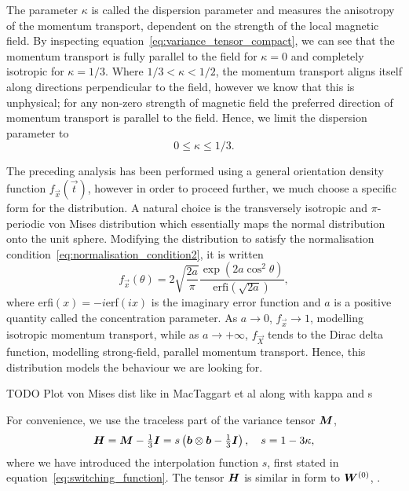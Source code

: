The parameter $\kappa$ is called the dispersion parameter and measures the anisotropy of the momentum transport, dependent on the strength of the local magnetic field. By inspecting equation~\ref{eq:variance_tensor_compact}, we can see that the momentum transport is fully parallel to the field for $\kappa = 0$ and completely isotropic for $\kappa = 1/3$. Where $1/3 < \kappa < 1/2$, the momentum transport aligns itself along directions perpendicular to the field, however we know that this is unphysical; for any non-zero strength of magnetic field the preferred direction of momentum transport is parallel to the field. Hence, we limit the dispersion parameter to
\begin{equation}
  \label{eq:dispersion_limits}
0 \leq \kappa \leq 1/3.
\end{equation}

The preceding analysis has been performed using a general orientation density function $f_\vec{x}(\vec{t})$, however in order to proceed further, we much choose a specific form for the distribution. A natural choice is the transversely isotropic and $\pi$-periodic von Mises distribution which essentially maps the normal distribution onto the unit sphere. Modifying the distribution to satisfy the normalisation condition~\ref{eq:normalisation_condition2}, it is written
\begin{equation}
  \label{eq:von_mises}
f_{\vec{x}}(\theta) = 2 \sqrt{\frac{2a}{\pi}} \frac{\exp(2a \cos^2 \theta)}{\text{erfi}(\sqrt{2a})},
\end{equation}
where erfi$(x) = -i$erf$(ix)$ is the imaginary error function and $a$ is a positive quantity called the concentration parameter. As $a \to 0$, $f_{\vec{x}} \to 1$, modelling isotropic momentum transport, while as $a \to + \infty$, $f_{\vec{X}}$ tends to the Dirac delta function, modelling strong-field, parallel momentum transport. Hence, this distribution models the behaviour we are looking for.

TODO Plot von Mises dist like in MacTaggart et al along with kappa and s

For convenience, we use the traceless part of the variance tensor ${\bm M}$,
\begin{equation}
  \label{eq:structure_tensor}
{\bm H} = {\bm M} - \tfrac{1}{3} {\bm I} = s \left ( {\bm b} \otimes {\bm b} - \tfrac{1}{3} {\bm I} \right), \quad s = 1 - 3\kappa,
\end{equation}
where we have introduced the interpolation function $s$, first stated in equation~\ref{eq:switching_function}. The tensor ${\bm H}$ is similar in form to ${\bm W}^{(0)}$, .

